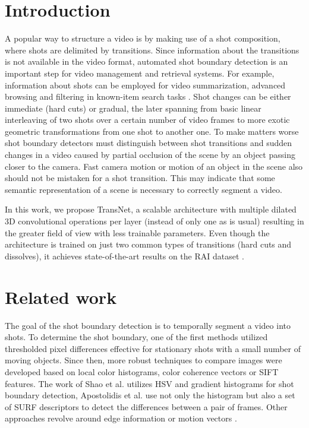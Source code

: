 \section{Introduction}
A popular way to structure a video is by making use of a shot composition, where shots are delimited by transitions. Since information about the transitions is not available in the video format, automated shot boundary detection is an important step for video management and retrieval systems. For example, information about shots can be employed for video summarization, advanced browsing and filtering in known-item search tasks \cite{CobarzanSBHBLVB17,LokocBSMA18,Lokoc2019}.
Shot changes can be either immediate (hard cuts) or gradual, the later spanning from basic linear interleaving of two shots over a certain number of video frames to more exotic geometric transformations from one shot to another one.
To make matters worse shot boundary detectors must distinguish between shot transitions and sudden changes in a video caused by partial occlusion of the scene by an object passing closer to the camera. Fast camera motion or motion of an object in the scene also should not be mistaken for a shot transition. This may indicate that some semantic representation of a scene is necessary to correctly segment a video.

In this work, we propose TransNet, a scalable architecture with multiple dilated 3D convolutional operations per layer (instead of only one as is usual) resulting in the greater field of view with less trainable parameters. Even though the architecture is trained on just two common types of transitions (hard cuts and dissolves), it achieves state-of-the-art results on the RAI dataset \cite{Baraldi15}.

\section{Related work}
The goal of the shot boundary detection is to temporally segment a video into shots. To determine the shot boundary, one of the first methods utilized thresholded pixel differences \cite{zhang93} effective for stationary shots with a small number of moving objects. Since then, more robust techniques to compare images were developed based on local color histograms, color coherence vectors \cite{Pass1997} or SIFT features. The work of Shao et al. \cite{shao15} utilizes HSV and gradient histograms for shot boundary detection, Apostolidis et al. \cite{apostolidis14} use not only the histogram but also a set of SURF descriptors to detect the differences between a pair of frames. Other approaches revolve around edge information \cite{Huan2008} or motion vectors \cite{amel10}. 


